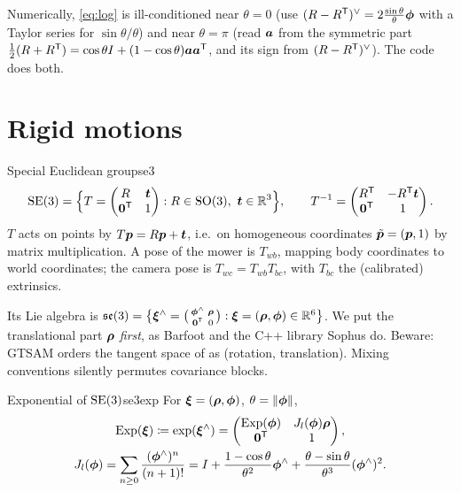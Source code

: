 Numerically, \eqref{eq:log} is ill-conditioned near $\theta=0$ (use
$(R-R^{\mathsf{T}})^{\vee}=2\frac{\sin\theta}{\theta}\bm{\phi}$ with a Taylor series for
$\sin\theta/\theta$) and near $\theta=\pi$ (read $\bm{a}$ from the
symmetric part $\tfrac12(R+R^{\mathsf{T}})=\cos\theta I+(1-\cos\theta)\bm{a}
\bm{a}^{\mathsf{T}}$, and its sign from $(R-R^{\mathsf{T}})^{\vee}$). The code does both.

\section{Rigid motions}

\begin{definition}{Special Euclidean group}{se3}
\[
\mathrm{SE}(3)=\Bigl\{T=\begin{pmatrix}R&\bm{t}\\\bm{0}^{\mathsf{T}}&1\end{pmatrix}:
R\in\mathrm{SO}(3),\ \bm{t}\in\mathbb{R}^3\Bigr\},\qquad
T^{-1}=\begin{pmatrix}R^{\mathsf{T}}&-R^{\mathsf{T}}\bm{t}\\\bm{0}^{\mathsf{T}}&1\end{pmatrix}.
\]
$T$ acts on points by $T\bm{p}=R\bm{p}+\bm{t}$, i.e.\ on homogeneous
coordinates $\tilde{\bm{p}}=(\bm{p},1)$ by matrix multiplication. A pose of the
mower is $T_{wb}$, mapping body coordinates to world coordinates; the
camera pose is $T_{wc}=T_{wb}T_{bc}$, with $T_{bc}$ the (calibrated)
extrinsics.
\end{definition}

Its Lie algebra is
$\mathfrak{se}(3)=\bigl\{\bm{\xi}^{\wedge}=\bigl(\begin{smallmatrix}\bm{\phi}^{\wedge}&\bm{\rho}\\
\bm{0}^{\mathsf{T}}&0\end{smallmatrix}\bigr):\bm{\xi}=(\bm{\rho},\bm{\phi})\in\mathbb{R}^6\bigr\}$.
We put the translational part $\bm{\rho}$ \emph{first}, as Barfoot and the
C++ library Sophus do. Beware: GTSAM orders the tangent space of
 as (rotation, translation). Mixing conventions silently
permutes covariance blocks.

\begin{theorem}{Exponential of $\mathrm{SE}(3)$}{se3exp}
For $\bm{\xi}=(\bm{\rho},\bm{\phi})$, $\theta=\left\lVert \bm{\phi}\right\rVert$,
\begin{gather}
\operatorname{Exp}(\bm{\xi})\coloneqq\exp(\bm{\xi}^{\wedge})=
\begin{pmatrix}\operatorname{Exp}(\bm{\phi})&J_l(\bm{\phi})\bm{\rho}\\\bm{0}^{\mathsf{T}}&1\end{pmatrix},
\label{eq:se3exp}\\
J_l(\bm{\phi})=\sum_{n\ge0}\frac{(\bm{\phi}^{\wedge})^n}{(n+1)!}
=I+\frac{1-\cos\theta}{\theta^2}\bm{\phi}^{\wedge}
+\frac{\theta-\sin\theta}{\theta^3}(\bm{\phi}^{\wedge})^2 .\notag
\end{gather}
\end{theorem}

